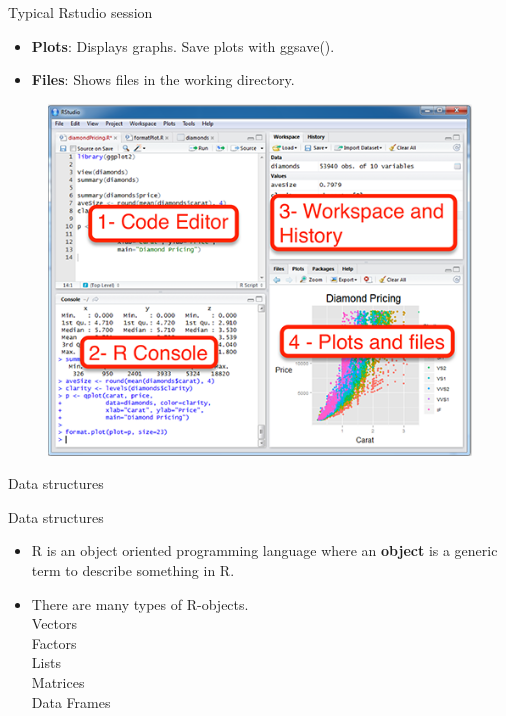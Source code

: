 \documentclass[
  ignorenonframetext,
]{beamer}
\providecommand{\tightlist}{%
  \setlength{\itemsep}{0pt}\setlength{\parskip}{0pt}}
\begin{document}
\begin{frame}{Typical Rstudio session}
\label{typical-rstudio-session-3}
\begin{itemize}
\tightlist
\item
  \textbf{Plots}: Displays graphs. Save plots with ggsave().
\item
  \textbf{Files}: Shows files in the working directory.
\end{itemize}

\begin{figure}
\includegraphics[width=0.5\linewidth]{fig/Rstudio} \end{figure}
\end{frame}

\begin{frame}{Data structures}
\label{data-structures}
\end{frame}

\begin{frame}{Data structures}
\label{data-structures-1}
\begin{itemize}
\tightlist
\item
  R is an object oriented programming language where an \textbf{object}
  is a generic term to describe something in R.
\end{itemize}

\begin{itemize}
\tightlist
\item
  There are many types of R-objects.\\
  Vectors\\
  Factors\\
  Lists\\
  Matrices\\
  Data Frames
\end{itemize}
\end{frame}
\end{document}
